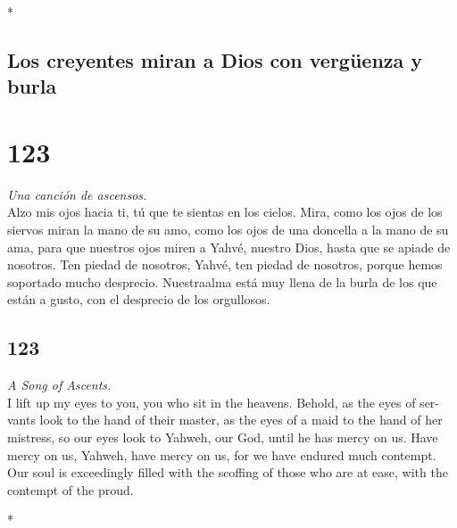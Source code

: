 \begin{paracol}{2}
\begin{otherlanguage}{english}
\end{otherlanguage}

\switchcolumn[0]*

\hypertarget{los-creyentes-miran-a-dios-con-verguxfcenza-y-burla}{%
\subsection{Los creyentes miran a Dios con vergüenza y
burla}\label{los-creyentes-miran-a-dios-con-verguxfcenza-y-burla}}

\hypertarget{section-244}{%
\section{123}\label{section-244}}

\emph{Una canción de ascensos.}\\
 Alzo mis ojos hacia ti, tú que te sientas en los cielos.
 Mira, como los ojos de los siervos miran la mano de su
amo, como los ojos de una doncella a la mano de su ama, para que
nuestros ojos miren a Yahvé, nuestro Dios, hasta que se apiade de
nosotros.  Ten piedad de nosotros, Yahvé, ten piedad de
nosotros, porque hemos soportado mucho desprecio. 
Nuestraalma está muy llena de la burla de los que están a gusto, con el
desprecio de los orgullosos.

\switchcolumn
\begin{otherlanguage}{english}

\hypertarget{section-245}{%
\section{123}\label{section-245}}

\emph{A Song of Ascents.}\\
 I lift up my eyes to you, you who sit in the heavens.
 Behold, as the eyes of servants look to the hand of their
master, as the eyes of a maid to the hand of her mistress, so our eyes
look to Yahweh, our God, until he has mercy on us.  Have
mercy on us, Yahweh, have mercy on us, for we have endured much
contempt.  Our soul is exceedingly filled with the
scoffing of those who are at ease, with the contempt of the proud.

\end{otherlanguage}

\switchcolumn[0]*

\hypertarget{el-salvador-de-israel-necesitado}{%
}
\end{paracol}
